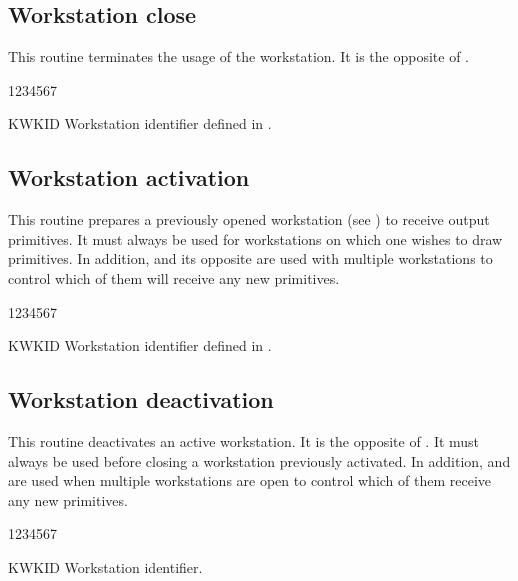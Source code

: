 \subsection{Workstation close}
\Action
This routine terminates the usage of the workstation. It is the opposite of
.
\Pdesc
\begin{DLtt}{1234567}
\item[KWKID] Workstation identifier defined in .
\end{DLtt}
%
\subsection{Workstation activation}
\Action
This routine prepares a previously opened workstation (see )
to receive output primitives. It must always be used for workstations on which
one wishes to draw primitives. In addition,  and its opposite
 are used with multiple workstations to control which of them will
receive any new primitives.
\Pdesc
\begin{DLtt}{1234567}
\item[KWKID] Workstation identifier defined in .
\end{DLtt}
%
\subsection{Workstation deactivation}
\Action
This routine deactivates an active workstation. It is the opposite of
. It must always be used before closing a workstation previously
activated. In addition,  and  are used when multiple
workstations are open to control which of them receive any new primitives.
\Pdesc
\begin{DLtt}{1234567}
\item[KWKID] Workstation identifier.
\end{DLtt}
%
